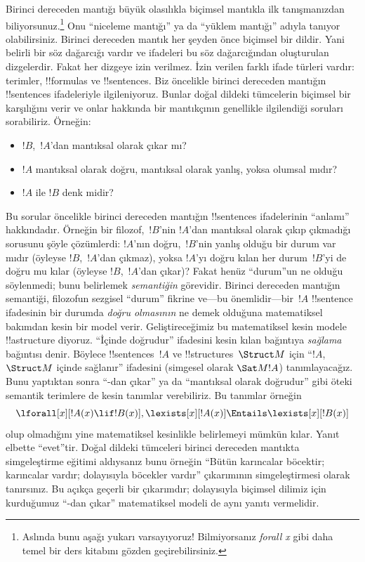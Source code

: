 \documentclass[../../../include/open-logic-section]{subfiles}
\begin{document}


Birinci dereceden mantığı büyük olasılıkla biçimsel mantıkla ilk
tanışmanızdan biliyorsunuz.\footnote{Aslında bunu aşağı yukarı
varsayıyoruz!{} Bilmiyorsanız \emph{forall x} \citep{Magnus2021} gibi
daha temel bir ders kitabını gözden geçirebilirsiniz.} Onu
``niceleme mantığı'' ya da ``yüklem mantığı'' adıyla tanıyor
olabilirsiniz. Birinci dereceden mantık her şeyden önce biçimsel bir
dildir. Yani belirli bir söz dağarcığı vardır ve ifadeleri bu söz
dağarcığından oluşturulan dizgelerdir. Fakat her dizgeye izin verilmez.
İzin verilen farklı ifade türleri vardır: terimler, !!{formula}s ve
!!{sentence}s. Biz öncelikle birinci dereceden mantığın
!!{sentence}s ifadeleriyle ilgileniyoruz. Bunlar doğal dildeki
tümcelerin biçimsel bir karşılığını verir ve onlar hakkında bir
mantıkçının genellikle ilgilendiği soruları sorabiliriz. Örneğin:
\begin{itemize}
    \item $!B$,~$!A$'dan mantıksal olarak çıkar mı?
    \item $!A$ mantıksal olarak doğru, mantıksal olarak yanlış, yoksa
olumsal mıdır?
    \item $!A$ ile $!B$ denk midir?
\end{itemize}

Bu sorular öncelikle birinci dereceden mantığın !!{sentence}s
ifadelerinin ``anlamı'' hakkındadır. Örneğin bir filozof,~$!B$'nin
$!A$'dan mantıksal olarak çıkıp çıkmadığı sorusunu şöyle çözümlerdi:
$!A$'nın doğru,~$!B$'nin yanlış olduğu bir durum var mıdır (öyleyse
$!B$,~$!A$'dan çıkmaz), yoksa $!A$'yı doğru kılan her durum~$!B$'yi
de doğru mu kılar (öyleyse $!B$,~$!A$'dan çıkar)? Fakat henüz
``durum''un ne olduğu söylenmedi; bunu belirlemek \emph{semantiğin}
görevidir. Birinci dereceden mantığın semantiği, filozofun sezgisel
``durum'' fikrine ve---bu önemlidir---bir~$!A$ !!{sentence} ifadesinin
bir durumda \emph{doğru olmasının} ne demek olduğuna matematiksel
bakımdan kesin bir model verir. Geliştireceğimiz bu matematiksel kesin
modele !!a{structure} diyoruz. ``İçinde doğrudur'' ifadesini kesin
kılan bağıntıya \emph{sağlama} bağıntısı denir. Böylece
!!{sentence}s~$!A$ ve !!{structure}s~$\Struct M$ için
``$!A$,~$\Struct M$ içinde sağlanır'' ifadesini (simgesel olarak
$\Sat M{!A}$) tanımlayacağız. Bunu yaptıktan sonra ``-dan çıkar'' ya da
``mantıksal olarak doğrudur'' gibi öteki semantik terimlere de kesin
tanımlar verebiliriz. Bu tanımlar örneğin
\[
\lforall[x][!A(x)\lif !B(x)],
\lexists[x][!A(x)] \Entails \lexists[x][!B(x)]
\]
olup olmadığını yine matematiksel kesinlikle belirlemeyi mümkün kılar.
Yanıt elbette ``evet''tir. Doğal dildeki tümceleri birinci dereceden
mantıkta simgeleştirme eğitimi aldıysanız bunu örneğin ``Bütün
karıncalar böcektir; karıncalar vardır; dolayısıyla böcekler vardır''
çıkarımının simgeleştirmesi olarak tanırsınız. Bu açıkça geçerli bir
çıkarımdır; dolayısıyla biçimsel dilimiz için kurduğumuz ``-dan çıkar''
matematiksel modeli de aynı yanıtı vermelidir.
\end{document}
